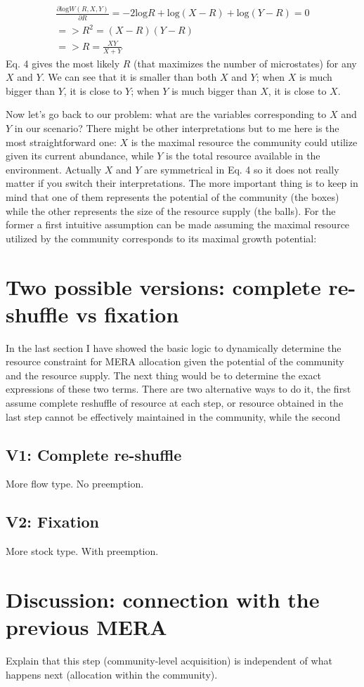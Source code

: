 \documentclass[12pt]{article}
\begin{document}
  \begin{equation}
 \begin{split}
\frac{\partial \mbox{log} W(R,X,Y)}{\partial R} =  - 2 \mbox{log} R + \mbox{log} (X-R) + \mbox{log} (Y-R) = 0\\
=> R^2 = (X-R)(Y-R)\\
=> R = \frac{XY}{X+Y}
\end{split}
\end{equation}
Eq. 4 gives the most likely $R$ (that maximizes the number of microstates) for any $X$ and $Y$. We can see that it is smaller than both $X$ and $Y$; when $X$ is much bigger than $Y$, it is close to $Y$; when $Y$ is much bigger than $X$, it is close to $X$.

Now let's go back to our problem: what are the variables corresponding to $X$ and $Y$ in our scenario? There might be other interpretations but to me here is the most straightforward one: $X$ is the maximal resource the community could utilize given its current abundance, while $Y$ is the total resource available in the environment. Actually $X$ and $Y$ are symmetrical in Eq. 4 so it does not really matter if you switch their interpretations. The more important thing is to keep in mind that one of them represents  the potential of the community (the boxes) while the other represents the size of the resource supply (the balls). For the former a first intuitive assumption can be made assuming the maximal resource utilized by the community corresponds to its maximal growth potential:

\section{Two possible versions: complete re-shuffle vs fixation}
In the last section I have showed the basic logic to dynamically determine the resource constraint for MERA allocation given the potential of the community and the resource supply. The next thing would be to determine the exact expressions of these two terms. There are two alternative ways to do it, the first assume complete reshuffle of resource at each step, or resource obtained in the last step cannot be effectively maintained in the community, while the second 

\subsection{V1: Complete re-shuffle}
More flow type. No preemption.

\subsection{V2: Fixation}
More stock type. With preemption.
 
\section{Discussion: connection with the previous MERA}
Explain that this step (community-level acquisition) is independent of what happens next (allocation within the community).
\end{document}
